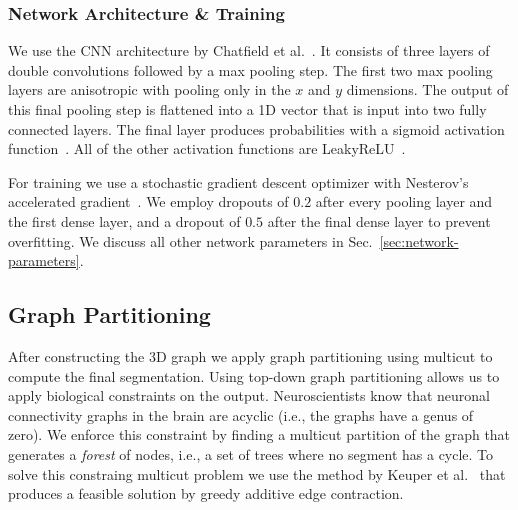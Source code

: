 \subsubsection{Network Architecture \& Training}

We use the CNN architecture by Chatfield et al.~\cite{chatfield2014return}. It consists of three layers of double convolutions followed by a max pooling step. The first two max pooling layers are anisotropic with pooling only in the $x$ and $y$ dimensions. The output of this final pooling step is flattened into a 1D vector that is input into two fully connected layers. The final layer produces probabilities with a sigmoid activation function~\cite{funahashi1989approximate}. All of the other activation functions are LeakyReLU~\cite{maas2013rectifier}.

For training we use a stochastic gradient descent optimizer with Nesterov's accelerated gradient~\cite{nesterov1983method}. We employ dropouts of $0.2$ after every pooling layer and the first dense layer, and a dropout of $0.5$ after the final dense layer to prevent overfitting. We discuss all other network parameters in Sec.~\ref{sec:network-parameters}.


\subsection{Graph Partitioning}

After constructing the 3D graph we apply graph partitioning using multicut to compute the final segmentation. Using top-down graph partitioning allows us to apply biological constraints on the output. Neuroscientists know that neuronal connectivity graphs in the brain are acyclic (i.e., the graphs have a genus of zero). We enforce this constraint by finding a multicut partition of the graph that generates a \textit{forest} of nodes, i.e., a set of trees where no segment has a cycle. To solve this constraing multicut problem we use the method by Keuper et al.~\cite{keuper2015efficient} that produces a feasible solution by greedy additive edge contraction.
